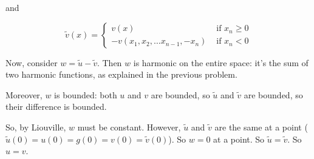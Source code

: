 \documentclass[a4paper,12pt]{article}
\begin{document}
and

\begin{displaymath}
\tilde{v}(x) =
   \left\{
     \begin{array}{lr}
       v(x) & \text{ if } x_n \geq 0\\
       -v(x_1,x_2, \ldots x_{n-1}, -x_n) & \text{ if } x_n < 0
     \end{array}
   \right.
\end{displaymath}

Now, consider $w = \tilde{u} - \tilde{v}$. Then $w$ is harmonic on the entire space: it's the sum of two harmonic functions, as explained in the previous problem.

Moreover, $w$ is bounded: both $u$ and $v$ are bounded, so $\tilde{u}$ and $\tilde{v}$ are bounded, so their difference is bounded.

So, by Liouville, $w$ must be constant. However, $\tilde{u}$ and $\tilde{v}$ are the same at a point ($\tilde{u}(0) = u(0) = g(0) = v(0) = \tilde{v}(0)$). So $w = 0$ at a point. So $\tilde{u} = \tilde{v}$. So $u = v$.

\shunt
\end{document}
